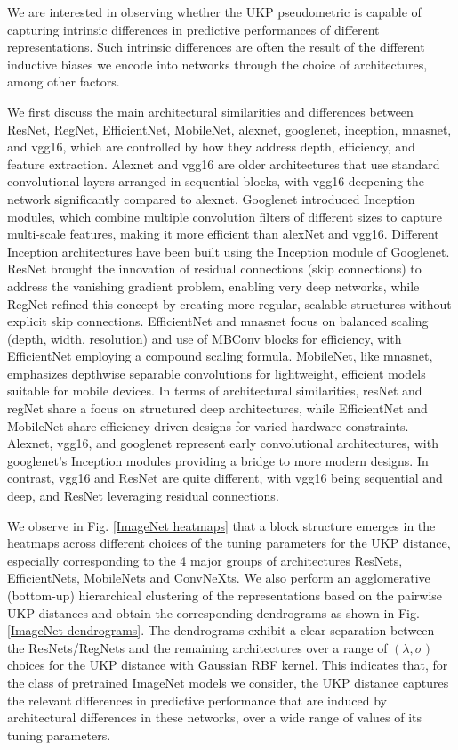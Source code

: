 \documentclass{article}
\theoremstyle{plain}
\newcommand{\metricstname}{UKP }
\begin{document}
We are interested in observing whether the \metricstname pseudometric is capable of capturing intrinsic differences in predictive performances of different representations. Such intrinsic differences are often the result of the different inductive biases we encode into networks through the choice of architectures, among other factors. 

We first discuss the main architectural similarities and differences between ResNet, RegNet, EfficientNet, MobileNet, alexnet, googlenet, inception, mnasnet, and vgg16, which are controlled by how they address depth, efficiency, and feature extraction. Alexnet and vgg16 are older architectures that use standard convolutional layers arranged in sequential blocks, with vgg16 deepening the network significantly compared to alexnet. Googlenet introduced Inception modules, which combine multiple convolution filters of different sizes to capture multi-scale features, making it more efficient than alexNet and vgg16. Different Inception architectures have been built using the Inception module of Googlenet. ResNet brought the innovation of residual connections (skip connections) to address the vanishing gradient problem, enabling very deep networks, while RegNet refined this concept by creating more regular, scalable structures without explicit skip connections. EfficientNet and mnasnet focus on balanced scaling (depth, width, resolution) and use of MBConv blocks for efficiency, with EfficientNet employing a compound scaling formula. MobileNet, like mnasnet, emphasizes depthwise separable convolutions for lightweight, efficient models suitable for mobile devices. In terms of architectural similarities, resNet and regNet share a focus on structured deep architectures, while EfficientNet and MobileNet share efficiency-driven designs for varied hardware constraints. Alexnet, vgg16, and googlenet represent early convolutional architectures, with googlenet’s Inception modules providing a bridge to more modern designs. In contrast, vgg16 and ResNet are quite different, with vgg16 being sequential and deep, and ResNet leveraging residual connections.

We observe in Fig. \ref{ImageNet heatmaps} that a block structure emerges in the heatmaps across different choices of the tuning parameters for the \metricstname distance, especially corresponding to the 4 major groups of architectures ResNets, EfficientNets, MobileNets and ConvNeXts. We also perform an agglomerative (bottom-up) hierarchical clustering of the representations based on the pairwise \metricstname distances and obtain the corresponding dendrograms as shown in Fig. \ref{ImageNet dendrograms}. The dendrograms exhibit a clear separation between the ResNets/RegNets and the remaining architectures over a range of $(\lambda,\sigma)$ choices for the \metricstname distance with Gaussian RBF kernel. This indicates that, for the class of pretrained ImageNet models we consider, the \metricstname distance captures the relevant differences in predictive performance that are induced by architectural differences in these networks, over a wide range of values of its tuning parameters.
\end{document}
